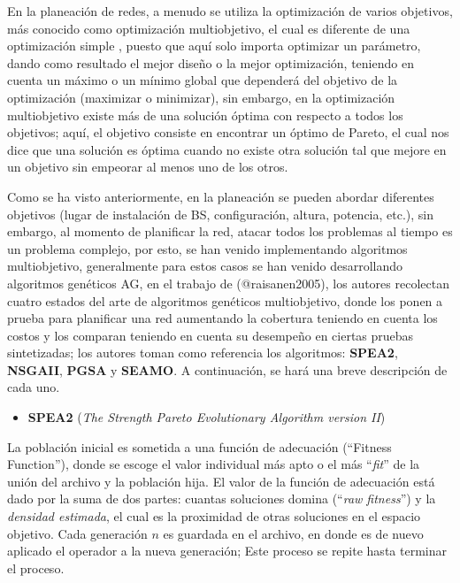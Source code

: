 \documentclass[]{article}
\providecommand{\tightlist}{%
  \setlength{\itemsep}{0pt}\setlength{\parskip}{0pt}}
\begin{document}
En la planeación de redes, a menudo se utiliza la optimización de varios
objetivos, más conocido como optimización multiobjetivo, el cual es
diferente de una optimización simple , puesto que aquí solo importa
optimizar un parámetro, dando como resultado el mejor diseño o la mejor
optimización, teniendo en cuenta un máximo o un mínimo global que
dependerá del objetivo de la optimización (maximizar o minimizar), sin
embargo, en la optimización multiobjetivo existe más de una solución
óptima con respecto a todos los objetivos; aquí, el objetivo consiste en
encontrar un óptimo de Pareto, el cual nos dice que una solución es
óptima cuando no existe otra solución tal que mejore en un objetivo sin
empeorar al menos uno de los otros.

Como se ha visto anteriormente, en la planeación se pueden abordar
diferentes objetivos (lugar de instalación de BS, configuración, altura,
potencia, etc.), sin embargo, al momento de planificar la red, atacar
todos los problemas al tiempo es un problema complejo, por esto, se han
venido implementando algoritmos multiobjetivo, generalmente para estos
casos se han venido desarrollando algoritmos genéticos AG, en el trabajo
de (@raisanen2005), los autores recolectan cuatro estados del arte de
algoritmos genéticos multiobjetivo, donde los ponen a prueba para
planificar una red aumentando la cobertura teniendo en cuenta los costos
y los comparan teniendo en cuenta su desempeño en ciertas pruebas
sintetizadas; los autores toman como referencia los algoritmos:
\textbf{SPEA2}, \textbf{NSGAII}, \textbf{PGSA} y \textbf{SEAMO}. A
continuación, se hará una breve descripción de cada uno.

\begin{itemize}
\tightlist
\item
  \textbf{SPEA2} (\emph{The Strength Pareto Evolutionary Algorithm
  version II})
\end{itemize}

La población inicial es sometida a una función de adecuación (``Fitness
Function''), donde se escoge el valor individual más apto o el más
``\emph{fit}'' de la unión del archivo y la población hija. El valor de
la función de adecuación está dado por la suma de dos partes: cuantas
soluciones domina (``\emph{raw fitness}'') y la \emph{densidad
estimada}, el cual es la proximidad de otras soluciones en el espacio
objetivo. Cada generación \(n\) es guardada en el archivo, en donde es
de nuevo aplicado el operador a la nueva generación; Este proceso se
repite hasta terminar el proceso.
\end{document}
